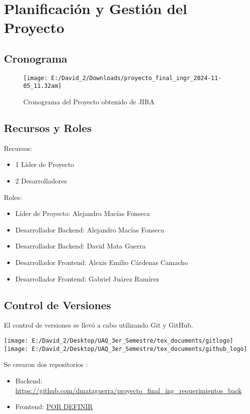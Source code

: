 	\chapter{Planificación y Gestión del Proyecto}
	\section{Cronograma}
	\begin{figure}[h]
		\centering
		\texttt{[image: E:/David\_2/Downloads/proyecto\_final\_ingr\_2024-11-05\_11.32am]}
		\caption{Cronograma del Proyecto obtenido de JIRA}
	\end{figure}
	
	\section{Recursos y Roles}
	Recursos:
	\begin{itemize}
		\item 1 Líder de Proyecto
		\item 2 Desarrolladores
	\end{itemize}

	Roles: 
	\begin{itemize}
		\item Líder de Proyecto: Alejandro Macías Fonseca
		\item Desarrollador Backend: Alejandro Macías Fonseca
		\item Desarrollador Backend: David Mata Guerra
		\item Desarrollador Frontend: Alexis Emilio Cárdenas Camacho
		\item Desarrollador Frontend: Gabriel Juárez Ramírez
	\end{itemize}
	
	\section{Control de Versiones}
	El control de versiones se llevó a cabo utilizando Git y GitHub. 
		\begin{center}
		\texttt{[image: E:/David\_2/Desktop/UAQ\_3er\_Semestre/tex\_documents/gitlogo]}
		\texttt{[image: E:/David\_2/Desktop/UAQ\_3er\_Semestre/tex\_documents/github\_logo]}
	\end{center}
	Se crearon dos repositorios :
	\begin{itemize}
		\item 	Backend: \url{https://github.com/dmataguerra/proyecto_final_ing_requerimientos_back}
		\item   Frontend: \url{POR DEFINIR}	
	\end{itemize}
